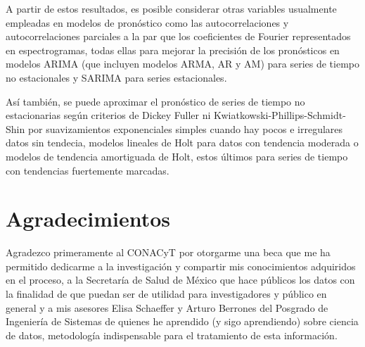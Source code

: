\documentclass[final,5p,times,twocolumn]{elsarticle}
\begin{document}
A partir de estos resultados, es posible considerar otras variables usualmente empleadas en modelos de pronóstico como las autocorrelaciones y autocorrelaciones parciales a la par que los coeficientes de Fourier representados en espectrogramas, todas ellas para mejorar la precisión de los pronósticos en modelos ARIMA (que incluyen modelos ARMA, AR y AM) para series de tiempo no estacionales y SARIMA para series estacionales. 

Así también, se puede aproximar el pronóstico de series de tiempo no estacionarias según criterios de Dickey Fuller ni Kwiatkowski-Phillips-Schmidt-Shin por suavizamientos exponenciales simples cuando hay pocos e irregulares datos sin tendecia, modelos lineales de Holt para datos con tendencia moderada o modelos de tendencia amortiguada de Holt, estos últimos para series de tiempo con tendencias fuertemente marcadas.

\section{Agradecimientos}
Agradezco primeramente al CONACyT por otorgarme una beca que me ha permitido dedicarme a la investigación y compartir mis conocimientos adquiridos en el proceso, a la Secretaría de Salud de México que hace públicos los datos con la finalidad de que puedan ser de utilidad para investigadores y público en general y a mis asesores Elisa Schaeffer y Arturo Berrones del Posgrado de Ingeniería de Sistemas de quienes he aprendido (y sigo aprendiendo) sobre ciencia de datos, metodología indispensable para el tratamiento de esta información.



\end{document}
